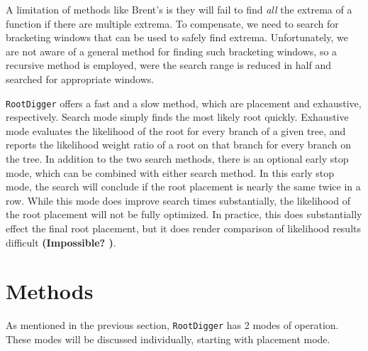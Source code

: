 \documentclass{article}
\newcommand{\RootDiggertt}{\texttt{RootDigger}}
\newcommand{\BenComment}[1]{{\bf \color{blue} ({#1})}}
\newcommand{\AlexisComment}[1]{{\bf \color{green} ({#1})}}
\begin{document}
A limitation of methods like Brent's is they will fail to find {\it all} the
extrema of a function if there are multiple extrema.
To compensate, we need to search for bracketing windows that can be used to
safely find extrema.
Unfortunately, we are not aware of a general method for finding such bracketing
windows, so a recursive method is employed, were the search range is reduced in
half and searched for appropriate\footnotemark{} windows.


\RootDiggertt{} offers a fast and a slow method, which are placement and
exhaustive, respectively.
Search mode simply finds the most likely root quickly.
Exhaustive mode evaluates the likelihood of the root for every branch of a
given tree, and reports the likelihood weight ratio
\cite{strimmer_inferring_2002} of a root on that branch for every branch on the
tree.
In addition to the two search methods, there is an optional early stop mode,
which can be combined with either search method.
In this early stop mode, the search will conclude if the root placement is
nearly the same twice in a row.
While this mode does improve search times substantially, the likelihood of the
root placement will not be fully optimized.
In practice, this does substantially effect the final root placement, but it
does render comparison of likelihood results difficult \BenComment{Impossible?
}.

\section{Methods}


As mentioned in the previous section, \RootDiggertt{} has 2 modes of operation.
These modes will be discussed individually, starting with placement mode.
\end{document}
